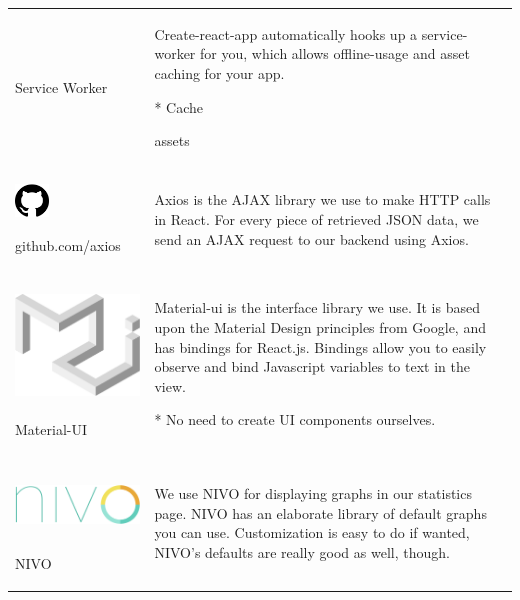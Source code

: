 \begin{longtable}[]{@{}ll@{}}
\begin{minipage}[t]{0.47\columnwidth}
Service Worker\strut
\end{minipage} & \begin{minipage}[t]{0.47\columnwidth}\raggedright
Create-react-app automatically hooks up a service-worker for you, which
allows offline-usage and asset caching for your app.

* Cache

assets\strut
\end{minipage}\tabularnewline
\begin{minipage}[t]{0.47\columnwidth}\raggedright
\includegraphics[width=0.34896in,height=0.34896in]{media/image23.png}

github.com/axios\strut
\end{minipage} & \begin{minipage}[t]{0.47\columnwidth}\raggedright
Axios is the AJAX library we use to make HTTP calls in React. For every
piece of retrieved JSON data, we send an AJAX request to our backend
using Axios.\strut
\end{minipage}\tabularnewline
\begin{minipage}[t]{0.47\columnwidth}\raggedright
\includegraphics[width=1.44761in,height=1.17188in]{media/image29.png}

Material-UI\strut
\end{minipage} & \begin{minipage}[t]{0.47\columnwidth}\raggedright
Material-ui is the interface library we use. It is based upon the
Material Design principles from Google, and has bindings for React.js.
Bindings allow you to easily observe and bind Javascript variables to
text in the view.

* No need to create UI components ourselves.\strut
\end{minipage}\tabularnewline
\begin{minipage}[t]{0.47\columnwidth}\raggedright
\includegraphics[width=2.08854in,height=0.65523in]{media/image35.png}

NIVO\strut
\end{minipage} & \begin{minipage}[t]{0.47\columnwidth}\raggedright
We use NIVO for displaying graphs in our statistics page. NIVO has an
elaborate library of default graphs you can use. Customization is easy
to do if wanted, NIVO's defaults are really good as well, though.\strut
\end{minipage}\tabularnewline
\bottomrule
\end{longtable}

